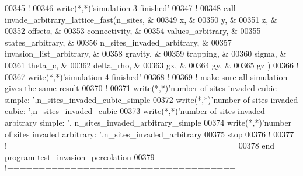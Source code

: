 \begin{DoxyCode}
00345 \textcolor{comment}{!}
00346 \textcolor{keyword}{write}(*,*)\textcolor{stringliteral}{'simulation 3 finished'}
00347 \textcolor{comment}{!}
00348 call invade\_arbitrary\_lattice\_fast(n\_sites,                   &
00349                                    x,                         &
00350                                    y,                         &
00351                                    z,                         &
00352                                    offsets,                   &
00353                                    connectivity,              &
00354                                    values\_arbitrary,          &
00355                                    states\_arbitrary,          &
00356                                    n\_sites\_invaded\_arbitrary, &
00357                                    invasion\_list\_arbitrary,   &
00358                                    gravity,                   &
00359                                    trapping,                  &
00360                                    sigma,                     &
00361                                    theta\_c,                   &
00362                                    delta\_rho,                 &
00363                                    gx,                        &
00364                                    gy,                        &
00365                                    gz                         )
00366 \textcolor{comment}{!}
00367 \textcolor{keyword}{write}(*,*)\textcolor{stringliteral}{'simulation 4 finished'}
00368 \textcolor{comment}{!}
00369 \textcolor{comment}{! make sure all simulation gives the same result}
00370 \textcolor{comment}{!}
00371 \textcolor{keyword}{write}(*,*)\textcolor{stringliteral}{'number of sites invaded cubic simple: '},n\_sites\_invaded\_cubic\_simple
00372 \textcolor{keyword}{write}(*,*)\textcolor{stringliteral}{'number of sites invaded cubic: '},n\_sites\_invaded\_cubic
00373 \textcolor{keyword}{write}(*,*)\textcolor{stringliteral}{'number of sites invaded arbitrary simple: '},
      n\_sites\_invaded\_arbitrary\_simple
00374 \textcolor{keyword}{write}(*,*)\textcolor{stringliteral}{'number of sites invaded arbitrary: '},n\_sites\_invaded\_arbitrary
00375 stop
00376 \textcolor{comment}{!}
00377 \textcolor{comment}{!====================================}
00378 \textcolor{keyword}{end program test\_invasion\_percolation}
00379 \textcolor{comment}{!====================================}
\end{DoxyCode}
